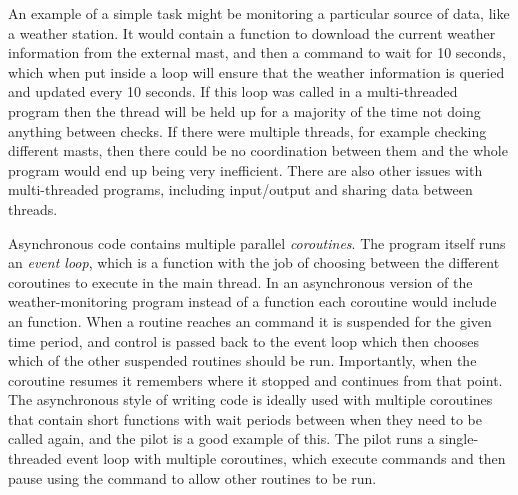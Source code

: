 \begin{colsection}
An example of a simple task might be monitoring a particular source of data, like a weather station. It would contain a function to download the current weather information from the external mast, and then a  command to wait for 10 seconds, which when put inside a loop will ensure that the weather information is queried and updated every 10 seconds. If this loop was called in a multi-threaded program then the thread will be held up for a majority of the time not doing anything between checks. If there were multiple threads, for example checking different masts, then there could be no coordination between them and the whole program would end up being very inefficient. There are also other issues with multi-threaded programs, including input/output and sharing data between threads.

Asynchronous code contains multiple parallel \textit{coroutines}. The program itself runs an \textit{event loop}, which is a function with the job of choosing between the different coroutines to execute in the main thread. In an asynchronous version of the weather-monitoring program instead of a  function each coroutine would include an  function. When a routine reaches an  command it is suspended for the given time period, and control is passed back to the event loop which then chooses which of the other suspended routines should be run. Importantly, when the coroutine resumes it remembers where it stopped and continues from that point. The asynchronous style of writing code is ideally used with multiple coroutines that contain short functions with wait periods between when they need to be called again, and the pilot is a good example of this. The pilot runs a single-threaded event loop with multiple coroutines, which execute commands and then pause using the  command to allow other routines to be run.

\end{colsection}



